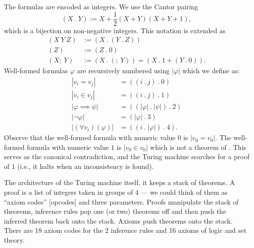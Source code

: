 \begin{node}
\begin{node}
\begin{node}[Encoding]\label{set:zfc-000K}%
The formulas are encoded as integers. We use the Cantor pairing
\begin{equation}
(X~.~Y):= X + \frac{1}{2}(X+Y)(X+Y+1),
\end{equation}
which is a bijection on non-negative integers. This notation is extended
as
\begin{subequations}
\begin{align}
(X~Y~Z) &:= (X~.~(Y~.~Z))\\
(Z) &:= (Z~.~0)\\
(X;~Y) &:= (X~.~(;~Y)) = (X~.~1+(Y~.~0)).
\end{align}
\end{subequations}
Well-formed formulas $\varphi$ are recursively numbered using
$|\varphi|$ which we define as:
\begin{subequations}
  \begin{align}
    |v_{i}=v_{j}| &= ((i~.~j)~.~0)\\
    |v_{i}\in v_{j}| &= ((i~.~j)~.~1)\\
    |\varphi\implies\psi| &= ((|\varphi|~.~|\psi|)~.~2)\\
    |\neg\varphi| &= (|\varphi|~.~3)\\
    |(\forall v_{i})(\varphi)| &= ((i~.~|\varphi|)~.~4).
  \end{align}
\end{subequations}
Observe that the well-formed formula with numeric value $0$ is $|v_{0}=v_{0}|$.
The well-formed formula with numeric value $1$ is $|v_{0}\in v_{0}|$
which is not a theorem of \ZF. This serves as the canonical
contradiction, and the Turing machine searches for a proof of $1$ (i.e.,
it halts when an inconsistency is found).
\end{node}

\begin{node}\label{set:zfc-000L}%
The architecture of the Turing machine itself, it keeps a stack of
theorems. A proof is a list of integers taken in groups of 4 --- we
could think of them as ``axiom codes'' [opcodes] and three parameters. 
Proofs manipulate the stack of theorems, inference rules pop one (or
two) theorems off and then push the inferred theorem back onto the stack.
Axioms push theorems onto the stack. There are 18 axiom codes for the 2
inference rules and 16 axioms of logic and set theory.


\end{node}
\end{node}
\end{node}
